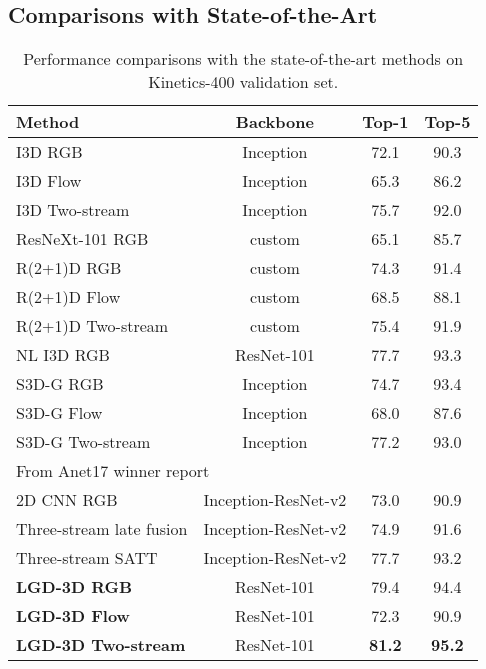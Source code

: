\documentclass[10pt,twocolumn,letterpaper]{article}
\begin{document}
\subsection{Comparisons with State-of-the-Art}
\begin{table}
\centering
\small
\caption{\small Performance comparisons with the state-of-the-art methods on Kinetics-400 validation set. }
\vspace{0.1cm}
\begin{tabular}{@{~}l@{~}c@{~}|c|c@{~~}} \hline
\begin{minipage}{1.5cm}\vspace{0.12cm} \textbf{Method} \vspace{0.12cm}\end{minipage} & \textbf{Backbone} & \textbf{Top-1} & \textbf{Top-5} \\ \hline
I3D RGB \cite{carreira2017quo} & Inception & 72.1 & 90.3 \\
I3D Flow \cite{carreira2017quo} & Inception & 65.3 & 86.2 \\
I3D Two-stream \cite{carreira2017quo} & Inception & 75.7 & 92.0 \\
ResNeXt-101 RGB \cite{hara2018can} & custom & 65.1 & 85.7 \\
R(2+1)D RGB \cite{tran2018closer} & custom & 74.3& 91.4\\
R(2+1)D Flow \cite{tran2018closer} & custom & 68.5& 88.1\\
R(2+1)D Two-stream \cite{tran2018closer} & custom & 75.4& 91.9\\
NL I3D RGB \cite{wang2018non} & ResNet-101 & 77.7 & 93.3 \\
S3D-G RGB \cite{xie2018rethinking} & Inception & 74.7 & 93.4\\
S3D-G Flow \cite{xie2018rethinking} & Inception & 68.0 & 87.6  \\
S3D-G Two-stream \cite{xie2018rethinking} & Inception & 77.2 & 93.0 \\\hline
\multicolumn{2}{l|}{From Anet17 winner report \cite{bian2017revisiting}} &&\\
2D CNN RGB & Inception-ResNet-v2  & 73.0 & 90.9 \\
Three-stream late fusion & Inception-ResNet-v2 & 74.9 & 91.6 \\
Three-stream SATT & Inception-ResNet-v2 & 77.7 & 93.2 \\ \hline
\textbf{LGD-3D RGB} & ResNet-101 & 79.4 & 94.4 \\
\textbf{LGD-3D Flow} & ResNet-101 & 72.3 & 90.9 \\
\textbf{LGD-3D Two-stream} & ResNet-101 & \textbf{81.2} & \textbf{95.2} \\ \hline
\end{tabular}
\vspace{-0.15in}
\label{tab:k400}
\end{table}
\end{document}
